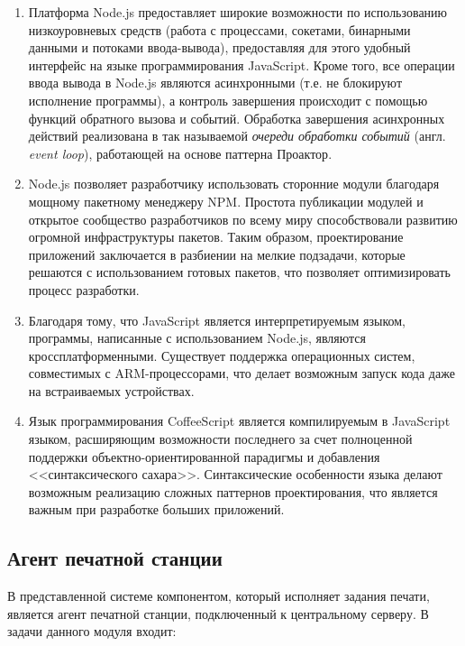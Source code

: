\documentclass[a4paper,14pt,href,draft]{article}
\begin{document}
\begin{enumerate}
  \item Платформа Node.js предоставляет широкие возможности по использованию низкоуровневых средств (работа с
  процессами, сокетами, бинарными данными и потоками ввода-вывода), предоставляя для этого удобный интерфейс на
  языке программирования JavaScript. Кроме того, все операции ввода вывода в Node.js являются асинхронными
  (т.е. не блокируют исполнение программы), а контроль завершения происходит с помощью функций обратного вызова
  и событий. Обработка завершения асинхронных действий реализована в так называемой \textit{очереди обработки событий}
  (англ. \textit{event loop})\cite{UnderstandingEvenLoop}, работающей на основе паттерна Проактор\cite{BoostProactor}.

  \item Node.js позволяет разработчику использовать сторонние модули благодаря мощному пакетному менеджеру NPM.
  Простота публикации модулей и открытое сообщество разработчиков по всему миру способствовали развитию огромной
  инфраструктуры пакетов\cite{NPMGrowth}. Таким образом, проектирование приложений заключается в разбиении на
  мелкие подзадачи, которые решаются с использованием готовых пакетов, что позволяет оптимизировать процесс разработки.

  \item Благодаря тому, что JavaScript является интерпретируемым языком, программы, написанные с использованием
  Node.js, являются кроссплатформенными. Существует поддержка операционных систем, совместимых с ARM-процессорами,
  что делает возможным запуск кода даже на встраиваемых устройствах.

  \item Язык программирования CoffeeScript является компилируемым в \newline JavaScript языком, расширяющим
  возможности последнего за счет полноценной поддержки объектно-ориентированной парадигмы и добавления
  <<синтаксического сахара>>. Синтаксические особенности языка делают возможным реализацию сложных паттернов
  проектирования, что является важным при разработке больших приложений\cite{CoffeeScriptCookbook}.
\end{enumerate}

\subsection{Агент печатной станции}
В представленной системе компонентом, который исполняет задания печати, является агент печатной станции, подключенный к
центральному серверу. В задачи данного модуля входит:
\end{document}
